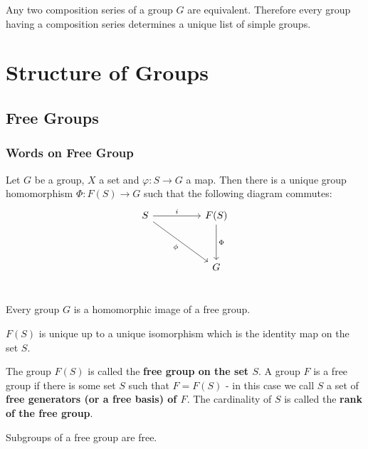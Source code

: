 \begin{theorem}
    Any two composition series of a group $G$ are equivalent.
    Therefore every group having a composition series determines a unique list of simple groups.
\end{theorem}






















\chapter{Structure of Groups}

\section{Free Groups} %

\subsection{Words on Free Group}
\begin{theorem}
    Let $G$ be a group, $X$ a set and $\varphi: S \rightarrow G$ a map. Then there is a unique group homomorphism $\Phi: F(S) \rightarrow G$ such that the following diagram commutes:
    \[
        \begin{tikzcd}
            S \arrow[rr,"i"] \arrow[rrdd, "\phi"'] &  & F(S) \arrow[dd, "\Phi"] \\
            &  &    \\
            &  & G  \\
        \end{tikzcd}
    \]
\end{theorem}
\begin{corollary}
    Every group $G$ is a homomorphic image of a free group.
\end{corollary}
\begin{corollary}
    $F(S)$ is unique up to a unique isomorphism which is the identity map on the set $S$.
\end{corollary}
\begin{definition}
    The group $F(S)$ is called the \textbf{free group on the set $S$}. A group $F$ is a free group if there is some set $S$ such that $F=F(S)$ - in this case we call $S$ a set of \textbf{free generators (or a free basis) of $F$}. The cardinality of $S$ is called the \textbf{rank of the free group}.
\end{definition}
\begin{theorem}[Schreier]
    Subgroups of a free group are free.
\end{theorem}

